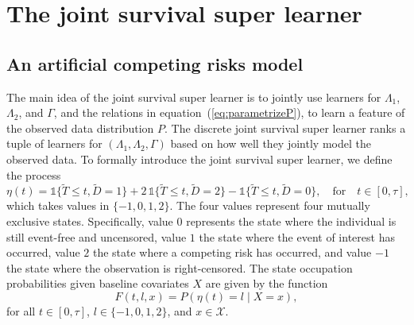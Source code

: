 \documentclass[lineno]{biometrika}
\newcommand{\1}{\mathds{1}}
\begin{document}
\section{The joint survival super learner}
\label{sec:super-learner-simple}

\subsection{An artificial competing risks model}
\label{sec:an-artif-comp}


The main idea of the joint survival super learner is to jointly use
learners for \( \Lambda_1 \), \( \Lambda_2 \), and \( \Gamma \), and
the relations in equation~(\ref{eq:parametrizeP}), to learn a feature
of the observed data distribution \( P \). The discrete joint survival
super learner ranks a tuple of learners for \( (\Lambda_1, \Lambda_2, \Gamma) \) based
on how well they jointly model the observed data. To formally
introduce the joint survival super learner, we define the process
\begin{equation*}
  \eta(t) = \1\{\tilde{T} \leq t, \tilde D=1\} + 2\,\1\{\tilde{T} \leq t, \tilde
  D=2\} - \1\{\tilde{T} \leq t, \tilde D=0\},
  \quad \text{for} \quad t \in [0, \tau],
\end{equation*}
which takes values in \( \{-1,0,1,2\}\). The four values
represent four mutually exclusive states. Specifically, value
\( 0 \) represents the state where the individual is still
event-free and uncensored, value \( 1\) the state where the
event of interest has occurred, value \( 2\) the state where a
competing risk has occurred, and value \( -1\) the state where
the observation is right-censored. The state occupation
probabilities given baseline covariates \( X \) are given by
the function
\begin{equation}
  \label{eq:F-def}
  F(t, l, x) = P(\eta(t) = l \mid X=x),
\end{equation}
for all \( t \in [0,\tau] \), \( l \in \{-1,0,1,2\} \), and
\( x \in \mathcal{X} \).
\end{document}
